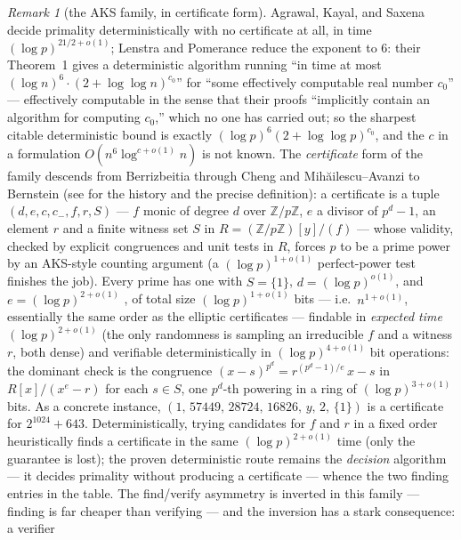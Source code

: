 \documentclass[11pt]{amsart}
\newcommand{\Z}{\mathbb{Z}}
\theoremstyle{plain}
\theoremstyle{definition}
\theoremstyle{remark}
\newtheorem{remark}[theorem]{Remark}
\begin{document}
\begin{remark}[the AKS family, in certificate form]\label{rem:aks}
Agrawal, Kayal, and Saxena \cite{AKS04} decide primality deterministically with no certificate at all,
in time $(\log p)^{21/2+o(1)}$; Lenstra and Pomerance \cite{LP19} reduce the exponent to $6$: their
Theorem~1 gives a deterministic algorithm running ``in time at most
$(\log n)^6\cdot(2+\log\log n)^{c_0}$'' for ``some effectively computable real number $c_0$'' ---
effectively computable in the sense that their proofs ``implicitly contain an algorithm for computing
$c_0$,'' which no one has carried out; so the sharpest citable deterministic bound is exactly
$(\log p)^6(2+\log\log p)^{c_0}$, and the $c$ in a formulation $O(n^6\log^{c+o(1)}n)$ is not known.
The \emph{certificate} form of the family descends from Berrizbeitia \cite{Berr05} through Cheng and
Mih\u{a}ilescu--Avanzi to Bernstein \cite{Ber07} (see \cite{Ber07} for the history and the precise
definition): a certificate is a tuple $(d, e, c, c_-, f, r, S)$ --- $f$ monic of degree $d$ over
$\Z/p\Z$, $e$ a divisor of $p^d - 1$, an element $r$ and a finite witness set $S$ in
$R = (\Z/p\Z)[y]/(f)$ --- whose validity, checked by explicit congruences and unit tests in $R$,
forces $p$ to be a prime power by an AKS-style counting argument (a $(\log p)^{1+o(1)}$
perfect-power test \cite{Ber98} finishes the job).  Every prime has one with $S = \{1\}$,
$d = (\log p)^{o(1)}$, and $e = (\log p)^{2+o(1)}$ \cite[Thms.~5.1--5.3]{Ber07}, of total size
$(\log p)^{1+o(1)}$ bits --- i.e.\ $n^{1+o(1)}$, essentially the same order as the elliptic
certificates --- findable in \emph{expected time $(\log p)^{2+o(1)}$} (the only randomness is
sampling an irreducible $f$ and a witness $r$, both dense) and verifiable deterministically in
$(\log p)^{4+o(1)}$ bit operations: the dominant check is the congruence
$(x-s)^{p^d} = r^{(p^d-1)/e}\,x - s$ in $R[x]/(x^e - r)$ for each $s \in S$, one $p^d$-th powering
in a ring of $(\log p)^{3+o(1)}$ bits.  As a concrete instance,
$(1,\,57449,\,28724,\,16826,\,y,\,2,\,\{1\})$ is a certificate for $2^{1024}+643$.  Deterministically,
trying candidates for $f$ and $r$ in a fixed order heuristically finds a certificate in the same
$(\log p)^{2+o(1)}$ time (only the guarantee is lost); the proven deterministic route remains the
\cite{LP19} \emph{decision} algorithm --- it decides primality without producing a certificate ---
whence the two finding entries in the table.  The find/verify asymmetry is inverted in this family
--- finding is far cheaper than verifying --- and the inversion has a stark consequence: a verifier

\end{remark}
\end{document}
